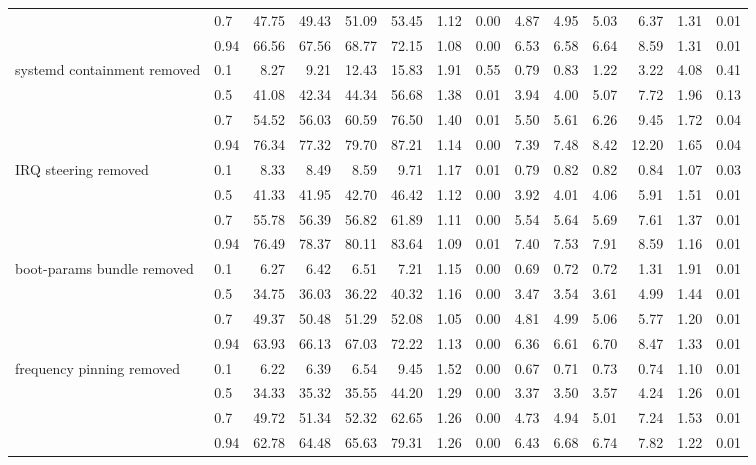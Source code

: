 \begin{table}
{\begin{tabular}{llrrrrrrrrrrrr}
 & 0.7 & 47.75 & 49.43 & 51.09 & 53.45 & 1.12 & 0.00 & 4.87 & 4.95 & 5.03 & 6.37 & 1.31 & 0.01 \\
 & 0.94 & 66.56 & 67.56 & 68.77 & 72.15 & 1.08 & 0.00 & 6.53 & 6.58 & 6.64 & 8.59 & 1.31 & 0.01 \\
\cmidrule{1-14}
\multirow[t]{4}{*}{systemd containment removed} & 0.1 & 8.27 & 9.21 & 12.43 & 15.83 & 1.91 & 0.55 & 0.79 & 0.83 & 1.22 & 3.22 & 4.08 & 0.41 \\
 & 0.5 & 41.08 & 42.34 & 44.34 & 56.68 & 1.38 & 0.01 & 3.94 & 4.00 & 5.07 & 7.72 & 1.96 & 0.13 \\
 & 0.7 & 54.52 & 56.03 & 60.59 & 76.50 & 1.40 & 0.01 & 5.50 & 5.61 & 6.26 & 9.45 & 1.72 & 0.04 \\
 & 0.94 & 76.34 & 77.32 & 79.70 & 87.21 & 1.14 & 0.00 & 7.39 & 7.48 & 8.42 & 12.20 & 1.65 & 0.04 \\
\cmidrule{1-14}
\multirow[t]{4}{*}{IRQ steering removed} & 0.1 & 8.33 & 8.49 & 8.59 & 9.71 & 1.17 & 0.01 & 0.79 & 0.82 & 0.82 & 0.84 & 1.07 & 0.03 \\
 & 0.5 & 41.33 & 41.95 & 42.70 & 46.42 & 1.12 & 0.00 & 3.92 & 4.01 & 4.06 & 5.91 & 1.51 & 0.01 \\
 & 0.7 & 55.78 & 56.39 & 56.82 & 61.89 & 1.11 & 0.00 & 5.54 & 5.64 & 5.69 & 7.61 & 1.37 & 0.01 \\
 & 0.94 & 76.49 & 78.37 & 80.11 & 83.64 & 1.09 & 0.01 & 7.40 & 7.53 & 7.91 & 8.59 & 1.16 & 0.01 \\
\cmidrule{1-14}
\multirow[t]{4}{*}{boot-params bundle removed} & 0.1 & 6.27 & 6.42 & 6.51 & 7.21 & 1.15 & 0.00 & 0.69 & 0.72 & 0.72 & 1.31 & 1.91 & 0.01 \\
 & 0.5 & 34.75 & 36.03 & 36.22 & 40.32 & 1.16 & 0.00 & 3.47 & 3.54 & 3.61 & 4.99 & 1.44 & 0.01 \\
 & 0.7 & 49.37 & 50.48 & 51.29 & 52.08 & 1.05 & 0.00 & 4.81 & 4.99 & 5.06 & 5.77 & 1.20 & 0.01 \\
 & 0.94 & 63.93 & 66.13 & 67.03 & 72.22 & 1.13 & 0.00 & 6.36 & 6.61 & 6.70 & 8.47 & 1.33 & 0.01 \\
\cmidrule{1-14}
\multirow[t]{4}{*}{frequency pinning removed} & 0.1 & 6.22 & 6.39 & 6.54 & 9.45 & 1.52 & 0.00 & 0.67 & 0.71 & 0.73 & 0.74 & 1.10 & 0.01 \\
 & 0.5 & 34.33 & 35.32 & 35.55 & 44.20 & 1.29 & 0.00 & 3.37 & 3.50 & 3.57 & 4.24 & 1.26 & 0.01 \\
 & 0.7 & 49.72 & 51.34 & 52.32 & 62.65 & 1.26 & 0.00 & 4.73 & 4.94 & 5.01 & 7.24 & 1.53 & 0.01 \\
 & 0.94 & 62.78 & 64.48 & 65.63 & 79.31 & 1.26 & 0.00 & 6.43 & 6.68 & 6.74 & 7.82 & 1.22 & 0.01 \\
\cmidrule{1-14}
\bottomrule
\end{tabular}%
}
\end{table}
